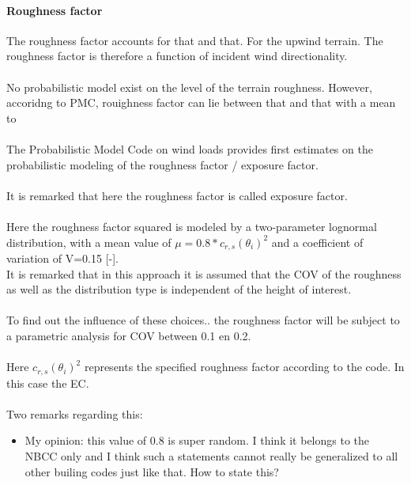 \paragraph{Roughness factor}
The roughness factor accounts for that and that. For the upwind terrain. The roughness factor is therefore a function of incident wind directionality.\\
\\
No probabilistic model exist on the level of the terrain roughness. However, accoridng to PMC, rouighness factor can lie between that and that with a mean to \\
\\
The Probabilistic Model Code on wind loads provides first estimates on the probabilistic modeling of the roughness factor / exposure factor. \\
\\
It is remarked that here the roughness factor is called exposure factor. \\
\\
Here the roughness factor squared is modeled by a two-parameter lognormal distribution, with a mean value of $\mu=0.8*c_{r,s}(\theta_i)^2$ and a coefficient of variation of V=0.15 [-]. \\
It is remarked that in this approach it is assumed that the COV of the roughness as well as the distribution type is independent of the height of interest. \\
\\
To find out the influence of these choices.. the roughness factor will be subject to a parametric analysis for COV between 0.1 en 0.2. \\
\\
Here $c_{r,s}(\theta_i)^2$ represents the specified roughness factor according to the code. In this case the EC. \\
\\
Two remarks regarding this:
\begin{itemize}
\item My opinion: this value of 0.8 is super random. I think it belongs to the NBCC only and I think such a statements cannot really be generalized to all other builing codes just like that. How to state this?
\end{itemize}



